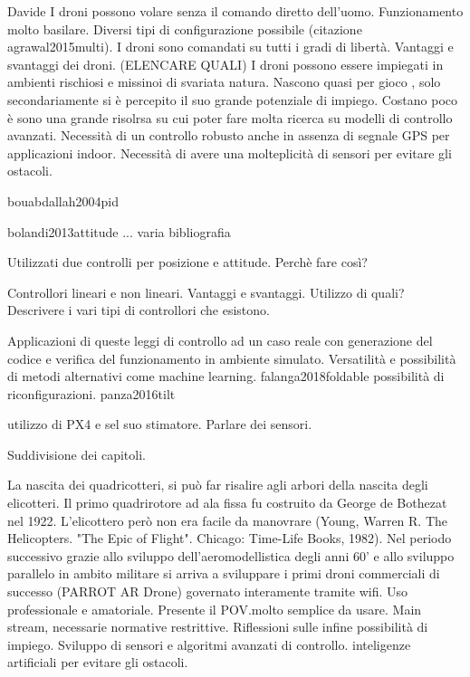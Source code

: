 \begin{commento}
	Davide 
	I droni possono volare senza il comando diretto dell'uomo. 
	Funzionamento molto basilare.
	Diversi tipi di configurazione possibile (citazione agrawal2015multi).
	I droni sono comandati su tutti i gradi di libertà.
	Vantaggi e svantaggi dei droni. (ELENCARE QUALI)
	I droni possono essere impiegati in ambienti rischiosi e missinoi di svariata natura.
	Nascono quasi per gioco , solo secondariamente si è percepito il suo grande potenziale di impiego.
	Costano poco è sono una grande risolrsa su cui poter fare molta ricerca su modelli di controllo avanzati.
	Necessità di un controllo robusto anche in assenza di segnale GPS per applicazioni indoor.
	Necessità di avere una molteplicità di sensori per evitare gli ostacoli.
	
	bouabdallah2004pid
	
	bolandi2013attitude ... varia bibliografia
	
	Utilizzati due controlli per posizione e attitude. Perchè fare così?
	
	Controllori lineari e non lineari. Vantaggi e svantaggi. Utilizzo di quali? Descrivere i vari tipi di controllori che esistono.
	
	Applicazioni di queste leggi di controllo ad un caso reale con generazione del codice e verifica del funzionamento in ambiente simulato.
	Versatilità e possibilità di metodi alternativi come machine learning.
	falanga2018foldable possibilità di riconfigurazioni. panza2016tilt
	
	utilizzo di PX4 e sel suo stimatore.
	Parlare dei sensori.
	
	Suddivisione dei capitoli.
\end{commento}
\begin{commento}
	La nascita dei quadricotteri, si può far risalire agli arbori della nascita degli elicotteri.
	Il primo quadrirotore ad ala fissa fu costruito da George de Bothezat nel 1922. L'elicottero però non era facile da manovrare (Young, Warren R. The Helicopters. "The Epic of Flight". Chicago: Time-Life Books, 1982).
	Nel periodo successivo grazie allo sviluppo dell'aeromodellistica degli anni 60' e allo sviluppo parallelo in ambito militare si arriva a sviluppare i primi droni commerciali di successo (PARROT AR Drone) governato interamente tramite wifi. Uso professionale e amatoriale. Presente il POV.molto semplice da usare. Main stream, necessarie normative restrittive. Riflessioni sulle infine possibilità di impiego. Sviluppo di sensori e algoritmi avanzati di controllo. inteligenze artificiali per evitare gli ostacoli.
\end{commento}

